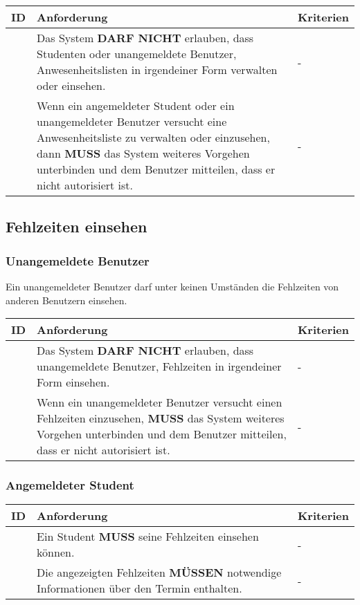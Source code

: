 \vspace{12pt}

\begin{tabular} {|p{}|p{}|p{}|}
	\hline
	ID & Anforderung & Kriterien \\
	\hline
	\printfreqnr
	& Das System \textbf{DARF NICHT} erlauben, dass Studenten oder unangemeldete Benutzer, Anwesenheitslisten in irgendeiner Form verwalten oder einsehen. 
	& - \\
	\hline
	\printfreqnr
	& Wenn ein angemeldeter Student oder ein unangemeldeter Benutzer versucht eine Anwesenheitsliste zu verwalten oder einzusehen, dann \textbf{MUSS} das System weiteres Vorgehen unterbinden und dem Benutzer mitteilen, dass er nicht autorisiert ist.
	& - \\ 
	\hline
\end{tabular}

\newpage

\subsection{Fehlzeiten einsehen}

\subsubsection{Unangemeldete Benutzer}
Ein unangemeldeter Benutzer darf unter keinen Umständen die Fehlzeiten von anderen Benutzern einsehen.

\vspace{12pt}

\begin{tabular} {|p{}|p{}|p{}|}
	\hline
	ID & Anforderung & Kriterien \\
	\hline
	\printfreqnr
	& Das System \textbf{DARF NICHT} erlauben, dass unangemeldete Benutzer, Fehlzeiten in irgendeiner Form einsehen. 
	& - \\
	\hline
	\printfreqnr
	& Wenn ein unangemeldeter Benutzer versucht einen Fehlzeiten einzusehen, \textbf{MUSS} das System weiteres Vorgehen unterbinden und dem Benutzer mitteilen, dass er nicht autorisiert ist.
	& - \\ 
	\hline
\end{tabular}

\vspace{12pt}

\subsubsection{Angemeldeter Student}
\begin{tabular} {|p{}|p{}|p{}|}
	\hline
	ID & Anforderung & Kriterien \\
	\hline
	\printfreqnr
	& Ein Student \textbf{MUSS} seine Fehlzeiten einsehen können. 
	& - \\
	\hline
	\printfreqnr
	& Die angezeigten Fehlzeiten \textbf{MÜSSEN} notwendige Informationen über den Termin enthalten.
	& - \\ 
	\hline
\end{tabular}

